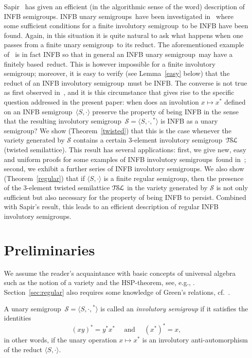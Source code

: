 \documentclass[smallextended]{svjour3}
\newcommand{\sgp}{semi\-group}
\newcommand{\sgps}{semi\-groups}
\newcommand{\is}{involutory semi\-group}
\newcommand{\iss}{involutory semi\-groups}
\newcommand{\fis}{finite involutory semi\-group}
\newcommand{\fus}{finite unary \sgp}
\newcommand{\fb}{finitely based}
\newcommand{\TSL}{\ensuremath{\mathcal{T\kern-.5pt S\kern-.5pt L}}}
\begin{document}
Sapir~\cite{Sapir:1987} has given an efficient (in the algorithmic sense of the word) description of INFB \sgps. INFB unary \sgps\ have
been investigated in~\cite{Dolinka:2010,ADV:2012} where some sufficient conditions for a \fis\ to be INFB have been found. Again, in this
situation it is quite natural to ask what happens when one passes from a \fus\ to its reduct. The aforementioned example
of~\cite{Lawrence&Willard:1998} is in fact INFB so that in general an INFB unary \sgp\ may have a \fb\ reduct. This is however impossible
for a \fis; moreover, it is easy to verify (see Lemma~\ref{easy} below) that the reduct of an INFB \is\ must be INFB. The converse is not
true as first observed in~\cite{Sapir:1993}, and it is this circumstance that gives rise to the specific question addressed in the present
paper: when does an involution $x\mapsto x^*$ defined on an INFB \sgp\ $\langle S,\cdot\rangle$ preserve the property of being INFB in the
sense that the resulting \is\ $\mathcal{S}=\langle S,\cdot,{}^*\rangle$ is INFB as a unary \sgp?  We show (Theorem~\ref{twisted}) that this
is the case whenever the variety generated by $\mathcal{S}$ contains a certain 3-element \is\ $\TSL$ (twisted semilattice). This result has
several applications: first, we give new, easy and uniform proofs for some examples of INFB \iss\ found in~\cite{ADV:2012}; second, we
exhibit a further series of INFB \iss. We also show (Theorem~\ref{regular}) that if $\langle S,\cdot\rangle$ is a finite regular \sgp, then
the presence of the 3-element twisted semilattice $\TSL$ in the variety generated by $\mathcal{S}$ is not only sufficient but also
necessary for the property of being INFB to persist. Combined with Sapir's result, this leads to an efficient description of regular INFB
\iss.

\section{Preliminaries}
\label{sec:preliminaries}

We assume the reader's acquaintance with basic concepts of universal algebra such as the notion of a variety and the HSP-theorem, see,
e.g., \cite[Chapter~II]{BuSa81}. Section~\ref{sec:regular} also requires some knowledge of Green's relations, cf.~\cite[Chapter~2]{how}.

A unary \sgp\ $\mathcal{S}=\langle S,\cdot,{}^*\rangle$ is called an \emph{\is} if it satisfies the identities
\begin{equation}
\label{eq:invlution} (xy)^*=y^*x^* \quad \text{ and  }\quad (x^*)^*=x,
\end{equation}
in other words, if the unary operation $x\mapsto x^*$ is an involutory anti-automorphism of the reduct $\langle S,\cdot\rangle$.
\end{document}
